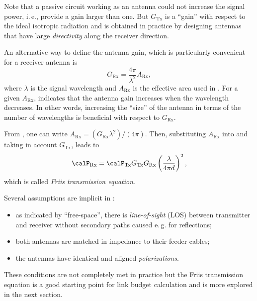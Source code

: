 Note that a passive circuit working as an antenna could not increase the signal power, i.\,e., provide
a gain larger than one. But $G_{\textrm{Tx}}$ is a ``gain'' with respect to the ideal isotropic radiation and is obtained in practice by designing antennas that have large \emph{directivity} along the receiver direction.

An alternative way to define the antenna gain, which is particularly convenient 
for a receiver antenna is
\begin{equation}
G_{\textrm{Rx}} = \frac{4 \pi}{\lambda^2} A_{\textrm{Rx}},
\label{eq:receiverAntennaGain}
\end{equation}
where $\lambda$ is the signal wavelength and 
$A_{\textrm{Rx}}$ is the effective area used in . For a given $A_{\textrm{Rx}}$,  
indicates that the antenna gain increases when the wavelength decreases.
In other words, increasing the ``size'' of the antenna in terms of the number of
wavelengths is beneficial with respect to $G_{\textrm{Rx}}$.

From , one can write $A_{\textrm{Rx}} = (G_{\textrm{Rx}} \lambda^2) / (4 \pi)$. Then, substituting $A_{\textrm{Rx}}$ into  and taking
in account $G_{\textrm{Tx}}$, leads to
\begin{equation}
\calP_{\textrm{Rx}}  = \calP_{\textrm{Tx}}  G_{\textrm{Tx}} G_{\textrm{Rx}}  \left( \frac{\lambda}{4 \pi d} \right)^2,
\label{eq:frissInLinearScale}
\end{equation}
which is called \emph{Friis transmission equation}.

Several assumptions are implicit in :
\begin{itemize}
	\item as indicated by ``free-space'', there is \emph{line-of-sight} (LOS) between transmitter and receiver without secondary paths caused e.\,g. for reflections;
	\item both antennas are matched in impedance to their feeder cables;
	\item the antennas have identical and aligned \emph{polarizations}.
\end{itemize}

These conditions are not completely met in practice but the Friis transmission equation is a good
starting point for link budget calculation and is more explored in the next section.

